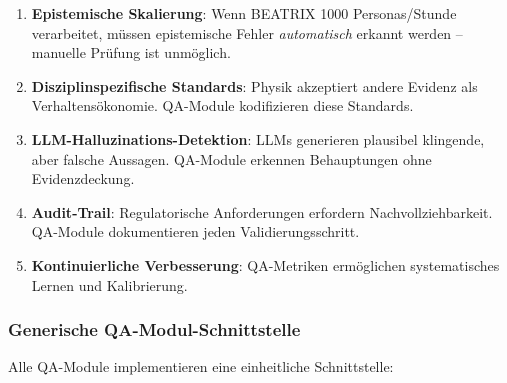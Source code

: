 \begin{enumerate}
    \item \textbf{Epistemische Skalierung}: Wenn BEATRIX 1000 Personas/Stunde verarbeitet, müssen epistemische Fehler \textit{automatisch} erkannt werden -- manuelle Prüfung ist unmöglich.

    \item \textbf{Disziplinspezifische Standards}: Physik akzeptiert andere Evidenz als Verhaltensökonomie. QA-Module kodifizieren diese Standards.

    \item \textbf{LLM-Halluzinations-Detektion}: LLMs generieren plausibel klingende, aber falsche Aussagen. QA-Module erkennen Behauptungen ohne Evidenzdeckung.

    \item \textbf{Audit-Trail}: Regulatorische Anforderungen erfordern Nachvollziehbarkeit. QA-Module dokumentieren jeden Validierungsschritt.

    \item \textbf{Kontinuierliche Verbesserung}: QA-Metriken ermöglichen systematisches Lernen und Kalibrierung.
\end{enumerate}

\subsubsection{Generische QA-Modul-Schnittstelle}

Alle QA-Module implementieren eine einheitliche Schnittstelle:

